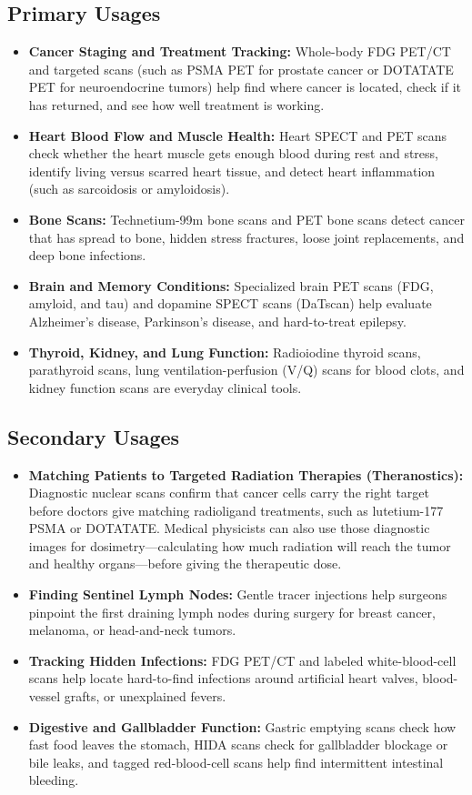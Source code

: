 \subsection{Primary Usages}
\begin{itemize}
  \item \textbf{Cancer Staging and Treatment Tracking:} Whole-body FDG PET/CT and targeted scans (such as PSMA PET for prostate cancer or DOTATATE PET for neuroendocrine tumors) help find where cancer is located, check if it has returned, and see how well treatment is working.
  \item \textbf{Heart Blood Flow and Muscle Health:} Heart SPECT and PET scans check whether the heart muscle gets enough blood during rest and stress, identify living versus scarred heart tissue, and detect heart inflammation (such as sarcoidosis or amyloidosis).
  \item \textbf{Bone Scans:} Technetium-99m bone scans and PET bone scans detect cancer that has spread to bone, hidden stress fractures, loose joint replacements, and deep bone infections.
  \item \textbf{Brain and Memory Conditions:} Specialized brain PET scans (FDG, amyloid, and tau) and dopamine SPECT scans (DaTscan) help evaluate Alzheimer's disease, Parkinson's disease, and hard-to-treat epilepsy.
  \item \textbf{Thyroid, Kidney, and Lung Function:} Radioiodine thyroid scans, parathyroid scans, lung ventilation-perfusion (V/Q) scans for blood clots, and kidney function scans are everyday clinical tools.
\end{itemize}

\subsection{Secondary Usages}
\begin{itemize}
  \item \textbf{Matching Patients to Targeted Radiation Therapies (Theranostics):} Diagnostic nuclear scans confirm that cancer cells carry the right target before doctors give matching radioligand treatments, such as lutetium-177 PSMA or DOTATATE. Medical physicists can also use those diagnostic images for dosimetry---calculating how much radiation will reach the tumor and healthy organs---before giving the therapeutic dose.
  \item \textbf{Finding Sentinel Lymph Nodes:} Gentle tracer injections help surgeons pinpoint the first draining lymph nodes during surgery for breast cancer, melanoma, or head-and-neck tumors.
  \item \textbf{Tracking Hidden Infections:} FDG PET/CT and labeled white-blood-cell scans help locate hard-to-find infections around artificial heart valves, blood-vessel grafts, or unexplained fevers.
  \item \textbf{Digestive and Gallbladder Function:} Gastric emptying scans check how fast food leaves the stomach, HIDA scans check for gallbladder blockage or bile leaks, and tagged red-blood-cell scans help find intermittent intestinal bleeding.
\end{itemize}

